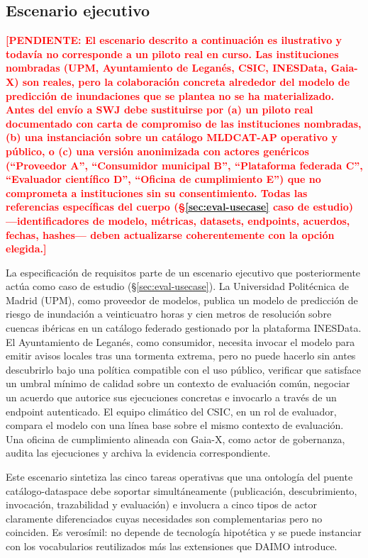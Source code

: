 \documentclass[Afour,sagev,times]{sagej}
\newcommand{\TODO}[1]{\textcolor{red}{\textbf{[PENDIENTE: #1]}}}
\begin{document}
\subsection{Escenario ejecutivo}\label{sec:scenario}

\TODO{El escenario descrito a continuación es ilustrativo y todavía no corresponde a un piloto real en curso. Las instituciones nombradas (UPM, Ayuntamiento de Leganés, CSIC, INESData, Gaia-X) son reales, pero la colaboración concreta alrededor del modelo de predicción de inundaciones que se plantea no se ha materializado. Antes del envío a SWJ debe sustituirse por (a) un piloto real documentado con carta de compromiso de las instituciones nombradas, (b) una instanciación sobre un catálogo MLDCAT-AP operativo y público, o (c) una versión anonimizada con actores genéricos (``Proveedor A'', ``Consumidor municipal B'', ``Plataforma federada C'', ``Evaluador científico D'', ``Oficina de cumplimiento E'') que no comprometa a instituciones sin su consentimiento. Todas las referencias específicas del cuerpo (§\ref{sec:eval-usecase} caso de estudio) ---identificadores de modelo, métricas, datasets, endpoints, acuerdos, fechas, hashes--- deben actualizarse coherentemente con la opción elegida.}

La especificación de requisitos parte de un escenario ejecutivo que posteriormente actúa como caso de estudio (§\ref{sec:eval-usecase}). La Universidad Politécnica de Madrid (UPM), como proveedor de modelos, publica un modelo de predicción de riesgo de inundación a veinticuatro horas y cien metros de resolución sobre cuencas ibéricas en un catálogo federado gestionado por la plataforma INESData. El Ayuntamiento de Leganés, como consumidor, necesita invocar el modelo para emitir avisos locales tras una tormenta extrema, pero no puede hacerlo sin antes descubrirlo bajo una política compatible con el uso público, verificar que satisface un umbral mínimo de calidad sobre un contexto de evaluación común, negociar un acuerdo que autorice sus ejecuciones concretas e invocarlo a través de un endpoint autenticado. El equipo climático del CSIC, en un rol de evaluador, compara el modelo con una línea base sobre el mismo contexto de evaluación. Una oficina de cumplimiento alineada con Gaia-X, como actor de gobernanza, audita las ejecuciones y archiva la evidencia correspondiente.

Este escenario sintetiza las cinco tareas operativas que una ontología del puente catálogo-dataspace debe soportar simultáneamente (publicación, descubrimiento, invocación, trazabilidad y evaluación) e involucra a cinco tipos de actor claramente diferenciados cuyas necesidades son complementarias pero no coinciden. Es verosímil: no depende de tecnología hipotética y se puede instanciar con los vocabularios reutilizados más las extensiones que DAIMO introduce.
\end{document}
